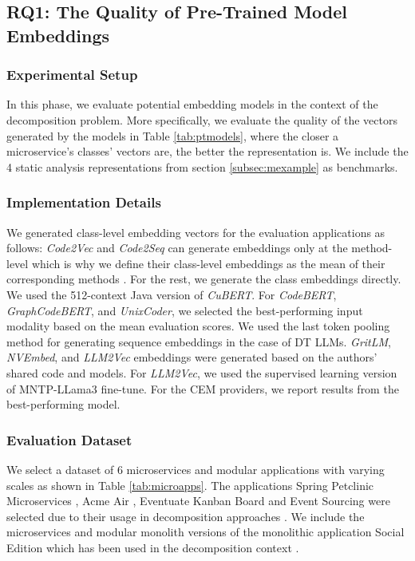 \subsection{RQ1: The Quality of Pre-Trained Model Embeddings}
\subsubsection{Experimental Setup}
In this phase, we evaluate potential embedding models in the context of the decomposition problem. More specifically, we evaluate the quality of the vectors generated by the models in Table \ref{tab:ptmodels}, where the closer a microservice’s classes’ vectors are, the better the representation is. We include the 4 static analysis representations from section \ref{subsec:mexample} as benchmarks. 



\subsubsection{Implementation Details}
We generated class-level embedding vectors for the evaluation applications as follows: \textit{Code2Vec} \cite{alon2018code2vec} and \textit{Code2Seq} \cite{alon2019code2seq} can generate embeddings only at the method-level which is why we define their class-level embeddings as the mean of their corresponding methods \cite{aldebagy2021code2vec}. For the rest, we generate the class embeddings directly. We used the 512-context Java version of \textit{CuBERT}. For \textit{CodeBERT}, \textit{GraphCodeBERT}, and \textit{UnixCoder}, we selected the best-performing input modality based on the mean evaluation scores. We used the last token pooling method for generating sequence embeddings in the case of DT LLMs. \textit{GritLM}, \textit{NVEmbed}, and \textit{LLM2Vec} embeddings were generated based on the authors' shared code and models. For \textit{LLM2Vec}, we used the supervised learning version \cite{parishad2024llm2vecsupervisedmodelcard} of MNTP-LLama3 \cite{aimeta2024llama3modelcard} fine-tune. For the CEM providers, we report results from the best-performing model. 



\subsubsection{Evaluation Dataset}\label{subsubsec:rq1dataset}
We select a dataset of 6 microservices and modular applications with varying scales as shown in Table \ref{tab:microapps}. The applications Spring Petclinic Microservices \cite{microapps2024petclinic}, Acme Air \cite{monoapps2024acmeair}, Eventuate Kanban Board \cite{microapps2024kanban} and Event Sourcing \cite{microapps2024eventsourcing} were selected due to their usage in decomposition approaches \cite{kalia2021mono2micro,mathai2022chgnn,khaled2022msextractor,khaled2022hydecomp}. We include the microservices \cite{microapps2024socialeditionmicroservices}  and modular monolith \cite{microapps2024socialeditionmodular} versions of the monolithic application Social Edition which has been used in the decomposition context \cite{faustino2022stepwise}.

